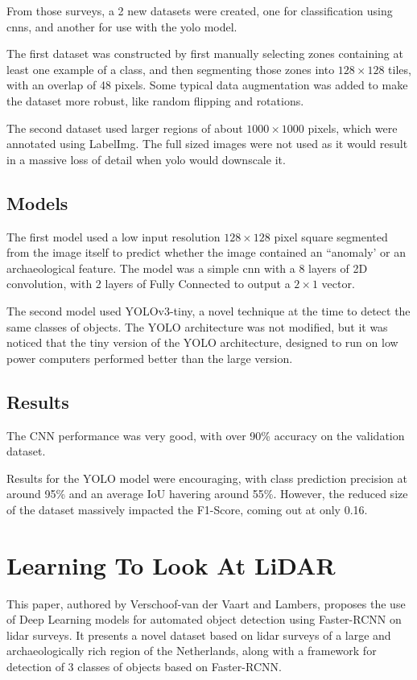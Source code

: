 From those surveys, a 2 new datasets were created, one for classification using \glspl{cnn}, and another for use with the \gls{yolo} model. 

The first dataset was constructed by first manually selecting zones containing at least one example of a class, and then segmenting those zones into $128 \times 128$ tiles, with an overlap of 48 pixels. Some typical data augmentation was added to make the dataset more robust, like random flipping and rotations. 

The second dataset used larger regions of about $1000 \times 1000$ pixels, which were annotated using LabelImg\cite{labelImg}. The full sized images were not used as it would result in a massive loss of detail when \gls{yolo} would downscale it.  

\subsection{Models}
The first model used a low input resolution $128\times 128$ pixel square segmented from the image itself to predict whether the image contained an ``anomaly' or an archaeological feature. The model was a simple \gls{cnn} with a 8 layers of 2D convolution, with 2 layers of Fully Connected to output a $2 \times 1$ vector.  

The second model used YOLOv3-tiny\cite{yolov3}, a novel technique at the time to detect the same classes of objects. The YOLO architecture was not modified, but it was noticed that the tiny version of the YOLO architecture, designed to run on low power computers performed better than the large version. 

\subsection{Results}
The CNN performance was very good, with over 90\% accuracy on the validation dataset.

Results for the YOLO model were encouraging, with class prediction precision at around 95\% and an average IoU havering around 55\%. However, the reduced size of the dataset massively impacted the F1-Score, coming out at only 0.16.

\section{Learning To Look At LiDAR}\label{learningLidar}
This paper, authored by Verschoof-van der Vaart and Lambers\cite{wouter2019}, proposes the use of Deep Learning models for automated object detection using Faster-RCNN\cite{FasterRCNN} on \gls{lidar} surveys. It presents a novel dataset based on \gls{lidar} surveys of a large and archaeologically rich region of the Netherlands, along with a framework for detection of 3 classes of objects based on Faster-RCNN.


